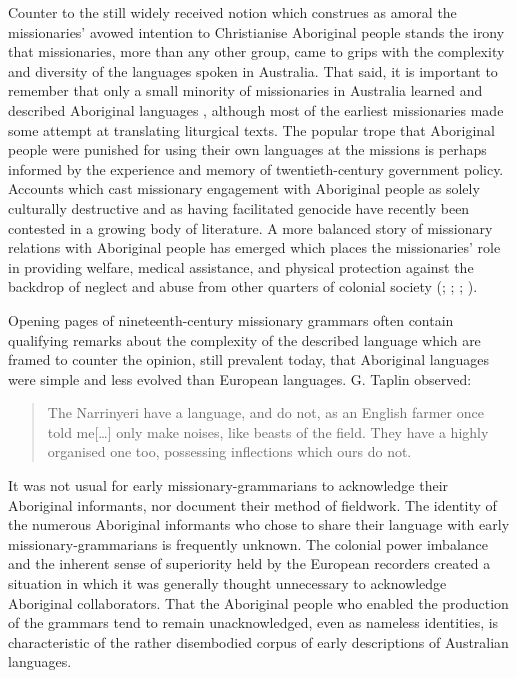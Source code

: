 Counter to the still widely received notion which construes as amoral the missionaries’ avowed intention to Christianise Aboriginal people stands the irony that missionaries, more than any other group, came to grips with the complexity and diversity of the languages spoken in Australia. That said, it is important to remember that only a small minority of missionaries in Australia learned and described Aboriginal languages \citep[805--806]{harris_one_1994}, although most of the earliest missionaries made some attempt at translating liturgical texts. The popular trope that Aboriginal people were punished for using their own languages at the missions is perhaps informed by the experience and memory of twentieth-century government policy. Accounts which cast missionary engagement with Aboriginal people as solely culturally destructive and as having facilitated genocide \citep[77--79]{dixon_languages_1980} have recently been contested in a growing body of literature. A more balanced story of missionary relations with Aboriginal people has emerged which places the missionaries’ role in providing welfare, medical assistance, and physical protection against the backdrop of neglect and abuse from other quarters of colonial society (\citealt{kneebone_teichelmann_2005}; \citealt{harris_one_1994}; \citealt{edwards_moravian_2007}; \citealt{strehlow_tale_2011}).

\hspace*{-1.6pt}Opening pages of nineteenth-century missionary grammars often contain qualifying remarks about the complexity of the described language which are framed to counter the opinion, still prevalent today, that Aboriginal languages were simple and less evolved than European languages. G. Taplin observed:

\begin{quote}
    The Narrinyeri have a language, and do not, as an English farmer once told me[…] only make noises, like beasts of the field. They have a highly organised one too, possessing inflections which ours do not. \citep[123]{taplin_narrinyeri_1879}
\end{quote}

It was not usual for early missionary-grammarians to acknowledge their Aboriginal informants, nor document their method of fieldwork. The identity of the numerous Aboriginal informants who chose to share their language with early missionary-grammarians is frequently unknown. The colonial power imbalance and the inherent sense of superiority held by the European recorders created a situation in which it was generally thought unnecessary to acknowledge Aboriginal collaborators. That the Aboriginal people who enabled the production of the grammars tend to remain unacknowledged, even as nameless identities, is characteristic of the rather disembodied corpus of early descriptions of Australian languages.

